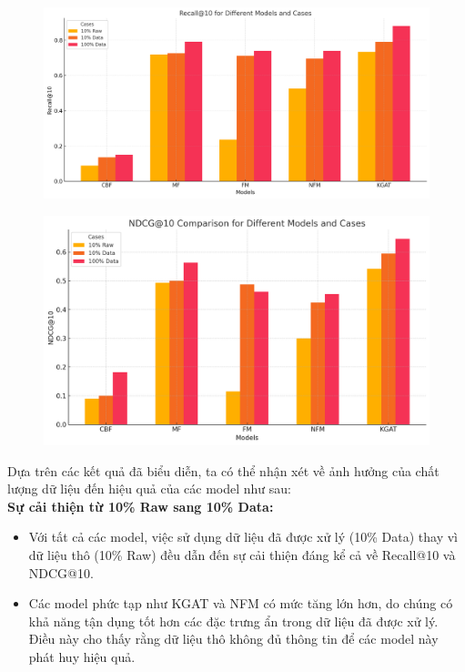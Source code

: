 \begin{figure}
    \centering
    \includegraphics[width=1\linewidth]{figures/recall_epoch.png}
\end{figure}
\begin{figure}
    \centering
    \includegraphics[width=1\linewidth]{figures/ndcg_epoch.png}
\end{figure}
\newpage
Dựa trên các kết quả đã biểu diễn, ta có thể nhận xét về ảnh hưởng của chất lượng dữ liệu đến hiệu quả của các model như sau:\\
\textbf{Sự cải thiện từ 10\% Raw sang 10\% Data:}
\begin{itemize}
    \item Với tất cả các model, việc sử dụng dữ liệu đã được xử lý (10\% Data) thay vì dữ liệu thô (10\% Raw) đều dẫn đến sự cải thiện đáng kể cả về Recall@10 và NDCG@10.
    \item Các model phức tạp như KGAT và NFM có mức tăng lớn hơn, do chúng có khả năng tận dụng tốt hơn các đặc trưng ẩn trong dữ liệu đã được xử lý. Điều này cho thấy rằng dữ liệu thô không đủ thông tin để các model này phát huy hiệu quả.
\end{itemize}
